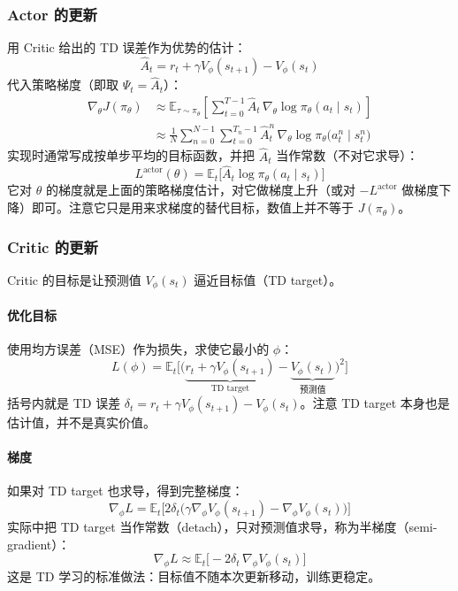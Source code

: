 \documentclass[UTF8,fontset=fandol]{ctexart}
\begin{document}
\subsubsection{Actor 的更新}

用 Critic 给出的 TD 误差作为优势的估计：
\[
\hat{A}_t=r_t+\gamma V_\phi(s_{t+1})-V_\phi(s_t)
\]
代入策略梯度（即取 $\Psi_t=\hat{A}_t$）：
\begin{align*}
\nabla_\theta J(\pi_\theta)
&\approx\mathbb{E}_{\tau\sim\pi_\theta}\left[\sum_{t=0}^{T-1}\hat{A}_t\,\nabla_\theta\log\pi_\theta(a_t\mid s_t)\right]\\
&\approx\frac{1}{N}\sum_{n=0}^{N-1}\sum_{t=0}^{T_n-1}\hat{A}_t^{n}\,\nabla_\theta\log\pi_\theta\big(a_t^{n}\mid s_t^{n}\big)
\end{align*}
实现时通常写成按单步平均的目标函数，并把 $\hat{A}_t$ 当作常数（不对它求导）：
\[
L^{\text{actor}}(\theta)=\mathbb{E}_t\big[\hat{A}_t\log\pi_\theta(a_t\mid s_t)\big]
\]
它对 $\theta$ 的梯度就是上面的策略梯度估计，对它做梯度上升（或对 $-L^{\text{actor}}$ 做梯度下降）即可。注意它只是用来求梯度的替代目标，数值上并不等于 $J(\pi_\theta)$。

\subsubsection{Critic 的更新}

Critic 的目标是让预测值 $V_\phi(s_t)$ 逼近目标值（TD target）。

\paragraph{优化目标}
使用均方误差（MSE）作为损失，求使它最小的 $\phi$：
\[
L(\phi)=\mathbb{E}_t\Big[\big(\underbrace{r_t+\gamma V_\phi(s_{t+1})}_{\text{TD target}}-\underbrace{V_\phi(s_t)}_{\text{预测值}}\big)^2\Big]
\]
括号内就是 TD 误差 $\delta_t=r_t+\gamma V_\phi(s_{t+1})-V_\phi(s_t)$。注意 TD target 本身也是估计值，并不是真实价值。

\paragraph{梯度}
如果对 TD target 也求导，得到完整梯度：
\[
\nabla_\phi L=\mathbb{E}_t\Big[2\delta_t\big(\gamma\nabla_\phi V_\phi(s_{t+1})-\nabla_\phi V_\phi(s_t)\big)\Big]
\]
实际中把 TD target 当作常数（detach），只对预测值求导，称为半梯度（semi-gradient）：
\[
\nabla_\phi L\approx\mathbb{E}_t\big[-2\delta_t\,\nabla_\phi V_\phi(s_t)\big]
\]
这是 TD 学习的标准做法：目标值不随本次更新移动，训练更稳定。
\end{document}
